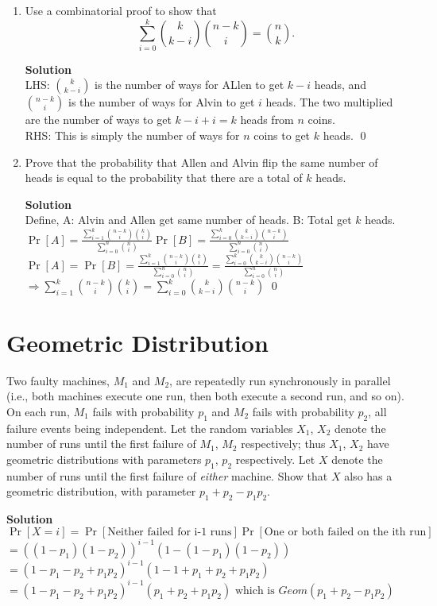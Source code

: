 \documentclass[11pt]{article}
\newcommand*{\Question}[1]{\section{#1}}
\newenvironment{Parts}{\begin{enumerate}[label=(\alph*)]}{\end{enumerate}}
\newcommand*{\Part}{\item}
\begin{document}
\begin{Parts}
	\Part Use a combinatorial proof to show that $$\sum_{i=0}^k \binom{k}{k - i} \binom{n - k}{i} = \binom{n}{k}.$$
\begin{mdframed} \textbf{Solution} \\
LHS: $\binom{k}{k-i}$ is the number of ways for ALlen to get $k-i$ heads, and $\binom{n-k}{i}$ is the number of ways for Alvin to get $i$ heads. The two multiplied are the number of ways to get $k-i+i=k$ heads from $n$ coins. \\
RHS: This is simply the number of ways for $n$ coins to get $k$ heads. \qed
\end{mdframed}

	\Part Prove that the probability that Allen and Alvin flip the same number of heads is equal to the probability that there are a total of $k$ heads.
\begin{mdframed} \textbf{Solution} \\
Define, A: Alvin and Allen get same number of heads. B: Total get $k$ heads. \\
$\Pr[A] = \frac{\sum_{i=1}^{k}\binom{n-k}{i}\binom{k}{i}}{\sum_{i=0}^{n}\binom{n}{i}} \Pr[B] = \frac{\sum_{i=0}^{k}\binom{k}{k-i}\binom{n-k}{i}}{\sum_{i=0}^{n}\binom{n}{i}}$ \\
$\Pr[A] = \Pr[B] = \frac{\sum_{i=1}^{k}\binom{n-k}{i}\binom{k}{i}}{\sum_{i=0}^{n}\binom{n}{i}} = \frac{\sum_{i=0}^{k}\binom{k}{k-i}\binom{n-k}{i}}{\sum_{i=0}^{n}\binom{n}{i}}$ \\
$\Rightarrow \sum_{i=1}^{k}\binom{n-k}{i}\binom{k}{i} = \sum_{i=0}^{k}\binom{k}{k-i}\binom{n-k}{i}$ \qed
\end{mdframed}
\end{Parts}


\Question{Geometric Distribution}

Two faulty machines, $M_1$ and $M_2$, are repeatedly run synchronously in parallel (i.e., both machines execute one run, then both execute a second run, and so on). On each run, $M_1$ fails with probability $p_1$ and $M_2$ fails with probability $p_2$, all failure events being independent. Let the random variables $X_1$, $X_2$ denote the number of runs until the first failure of $M_1$, $M_2$ respectively; thus $X_1$, $X_2$ have geometric distributions with parameters $p_1$, $p_2$ respectively. Let $X$ denote the number of runs until the first failure of \emph{either} machine. Show that $X$ also has a geometric distribution, with parameter $p_1+p_2-p_1p_2$.

\begin{mdframed} \textbf{Solution} \\
$\Pr[X=i] = \Pr[\text{Neither failed for i-1 runs}]\Pr[\text{One or both failed on the ith run}]$ \\
$= ((1-p_1)(1-p_2))^{i-1}(1-(1-p_1)(1-p_2))$ \\
$= (1-p_1-p_2+p_1p_2)^{i-1}(1-1+p_1+p_2+p_1p_2)$ \\
$= (1-p_1-p_2+p_1p_2)^{i-1}(p_1+p_2+p_1p_2) \text{ which is } Geom(p_1+p_2-p_1p_2)$ 
\end{mdframed}
\end{document}
